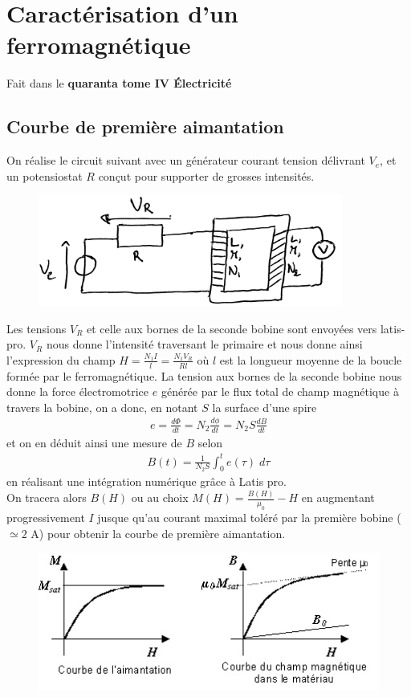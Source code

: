 \documentclass[12pt,prb,aps,epsf]{article}
\begin{document}
\section{Caractérisation d'un ferromagnétique}
Fait dans le \textbf{quaranta tome IV Électricité}

\subsection{Courbe de première aimantation}
On réalise le circuit suivant avec un générateur courant tension délivrant $V_e$, et un potensiostat $R$ conçut pour supporter de grosses intensités.\\
\begin{figure}[h]
	\centering \includegraphics[width=10cm]{circuit}
\end{figure}

Les tensions $V_R$ et celle aux bornes de la seconde bobine sont envoyées vers latis-pro. $V_R$ nous donne l'intensité traversant le primaire et nous donne ainsi l'expression du champ $H = \frac{N_1 I}{l} = \frac{N_1 V_R}{Rl}$ où $l$ est la longueur moyenne de la boucle formée par le ferromagnétique. La tension aux bornes de la seconde bobine nous donne la force électromotrice $e$ générée par le flux total de champ magnétique à travers la bobine, on a donc, en notant $S$ la surface d'une spire 
\begin{eqnarray}
e = \frac{d\Phi}{dt} = N_2\frac{d\phi}{dt} = N_2 S \frac{dB}{dt}
\end{eqnarray}
et on en déduit ainsi une mesure de $B$ selon
\begin{eqnarray}
B(t) = \frac{1}{N_2S} \int_0^t  e(\tau)\;d\tau
\end{eqnarray}
en réalisant une intégration numérique grâce à Latis pro.\\

On tracera alors $B(H)$ ou au choix $M(H) = \frac{B(H)}{\mu_0}-H$ en augmentant progressivement $I$ jusque qu'au courant maximal toléré par la première bobine ($\simeq 2$ A) pour obtenir la courbe de première aimantation.
\begin{figure}[h]
	\centering \includegraphics[width=12cm]{1ere_aimantation}
\end{figure}
\end{document}

